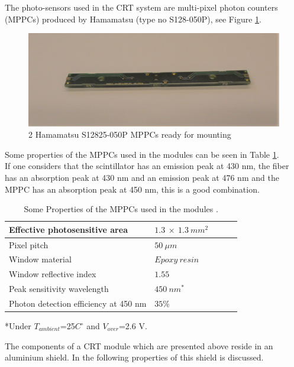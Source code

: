 \documentclass[a4paper]{article}\linespread{1.4}
\begin{document}
The photo-sensors used in the CRT system are multi-pixel photon counters (MPPCs) produced by Hamamatsu  (type no S128-050P), see Figure \ref{fig:mppc}. 
\begin{figure}[h!] \centering \includegraphics[width=120mm,scale=1.0]{figures/mppcpaint.png} \caption{2 Hamamatsu S12825-050P MPPCs ready for mounting} \label{fig:mppc}\end{figure}  
Some properties of the MPPCs used in the modules can be seen in Table \ref{tab:pprr}.
\\If one considers that the scintillator has an emission peak at 430 nm, the fiber has an absorption peak at 430 nm and an emission peak at 476 nm and the MPPC has an absorption peak at 450 nm, this is a good combination.
\begin{table}
     \centering
    \caption{Some Properties of the MPPCs used in the modules \cite{hama}. }
     \begin{tabular}{| l | l | l  | l | l |}
        \hline \hline 
        Effective photosensitive area & \(1.3\ \times \ 1.3 \ mm^{2} \)  \\     \hline 
        Pixel pitch & \( 50 \ \mu m \) \\      \hline 
        Window material& \( Epoxy\ resin \)  \\     \hline 
        Window reflective index & \( 1.55 \) \\      \hline
        Peak sensitivity wavelength & \( 450 \ nm ^{*}  \)  \\     \hline 
        Photon detection efficiency at 450 nm & \( 35 \% \) \\      \hline
 \end{tabular}
\label{tab:pprr}

\vspace{1ex}
\raggedright{*Under $T_{ambient}$=25$C^{\circ}$ and $V_{over}$=2.6 V.}
\centering
\end{table}

The components of a CRT module which are presented above reside in an aluminium shield. In the following properties of this shield is discussed.
\end{document}
